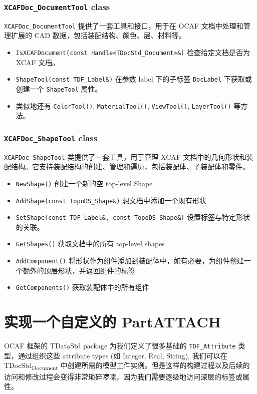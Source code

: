 \documentclass[11pt]{article}
\let\oldsection\section
\renewcommand{\section}{\clearpage\oldsection}
\begin{document}
\subsubsection{\texttt{XCAFDoc\_DocumentTool} class}
\label{sec:orga5634d7}

\texttt{XCAFDoc\_DocumentTool} 提供了一套工具和接口，用于在 OCAF 文档中处理和管理扩展的 CAD 数据，包括装配结构、颜色、层、材料等。

\begin{itemize}
\item \texttt{IsXCAFDocument(const Handle<TDocStd\_Document>\&)} 检查给定文档是否为 XCAF 文档。
\item \texttt{ShapeTool(const TDF\_Label\&)} 在参数 label 下的子标签 \texttt{DocLabel} 下获取或创建一个 \texttt{ShapeTool} 属性。
\item 类似地还有 \texttt{ColorTool()}, \texttt{MaterialTool()}, \texttt{ViewTool()}, \texttt{LayerTool()} 等方法。
\end{itemize}
\subsubsection{\texttt{XCAFDoc\_ShapeTool} class}
\label{sec:orgda0e9d2}

\texttt{XCAFDoc\_ShapeTool} 类提供了一套工具，用于管理 XCAF 文档中的几何形状和装配结构。它支持装配结构的创建、管理和遍历，包括装配体、子装配体和零件。

\begin{itemize}
\item \texttt{NewShape()} 创建一个新的空 top-level Shape
\item \texttt{AddShape(const TopoDS\_Shape\&)} 想文档中添加一个现有形状
\item \texttt{SetShape(const TDF\_Label\&, const TopoDS\_Shape\&)} 设置标签与特定形状的关联。
\item \texttt{GetShapes()} 获取文档中的所有 top-level shapes
\item \texttt{AddComponent()} 将形状作为组件添加到装配体中，如有必要，为组件创建一个额外的顶层形状，并返回组件的标签
\item \texttt{GetComponents()} 获取装配体中的所有组件
\end{itemize}
\section{实现一个自定义的 Part\hfill{}\textsc{ATTACH}}
\label{sec:orgda04962}
OCAF 框架的 TDataStd package 为我们定义了很多基础的 \texttt{TDF\_Attribute} 类型，通过组织这些 attribute types (如 Integer, Real, String), 我们可以在 TDocStd\textsubscript{Document} 中创建所需的模型工件实例。但是这样的构建过程以及后续的访问和修改过程会变得非常琐碎啰嗦，因为我们需要逐级地访问深层的标签或属性。
\end{document}
